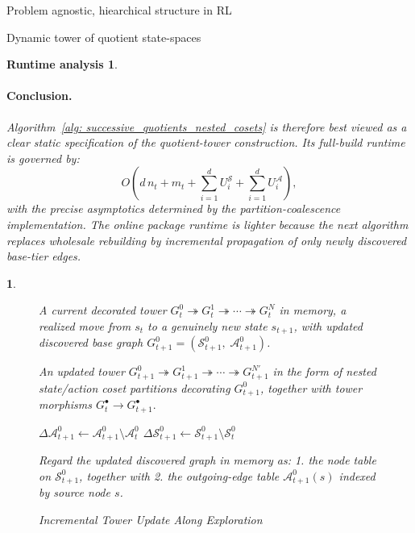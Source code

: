 \documentclass[11pt]{article}
\newtheorem{ermark}[subsubsection]{}
\newtheorem{run_analysis}[subsubsection]{Runtime analysis}
\begin{document}
\begin{section}{Problem agnostic, hiearchical structure in RL}
\begin{subsection}{Dynamic tower of quotient state-spaces}
\begin{run_analysis}
\paragraph{Conclusion.}
Algorithm~\ref{alg: successive_quotients_nested_cosets} is therefore best viewed as a clear \emph{static specification} of the quotient-tower construction. Its full-build runtime is governed by:
\[
O\!\left(
d\,n_t + m_t + \sum_{i=1}^d U_i^{\mathcal S} + \sum_{i=1}^d U_i^{\mathcal A}
\right),
\]
with the precise asymptotics determined by the partition-coalescence implementation. The online package runtime is lighter because the next algorithm replaces wholesale rebuilding by incremental propagation of only newly discovered base-tier edges.
\end{run_analysis}

\begin{ermark}

\begin{figure}[!h]
\begin{algorithm}[H]
\caption{Incremental Tower Update Along Exploration}
\label{alg: incremental_tower_update}
\begin{algorithmic}[1]

\Require
A current decorated tower
$
G_t^0 \twoheadrightarrow G_t^1 \twoheadrightarrow \cdots \twoheadrightarrow G_t^N
$
in memory, a realized move from $s_t$ to a genuinely new state $s_{t+1}$, with updated discovered base graph $G_{t+1}^0=(\mathcal{S}_{t+1}^0,\;\mathcal{A}_{t+1}^0)$.

\Ensure
An updated tower
$
G_{t+1}^0 \twoheadrightarrow G_{t+1}^1 \twoheadrightarrow \cdots \twoheadrightarrow G_{t+1}^{N'}
$
in the form of nested state/action coset partitions decorating $G_{t+1}^0$, together with tower morphisms
$
G_t^\bullet \longrightarrow G_{t+1}^\bullet.
$

\Statex


    \State $\Delta\mathcal{A}_{t+1}^0 \gets \mathcal{A}_{t+1}^0\setminus \mathcal{A}_t^0$
    \State $\Delta\mathcal{S}_{t+1}^0 \gets \mathcal{S}_{t+1}^0\setminus \mathcal{S}_t^0$

    \State Regard the updated discovered graph in memory as:
    1. the node table on $\mathcal{S}_{t+1}^0$, together with
    2. the outgoing-edge table $\mathcal{A}_{t+1}^0(s)$ indexed by source node $s$.



\end{algorithmic}
\end{algorithm}
\end{figure}
\end{ermark}
\end{subsection}
\end{section}
\end{document}
